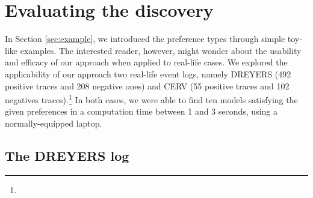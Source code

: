 









\section{Evaluating the discovery}
\label{sec:evaluation}


In Section \ref{sec:example}, we introduced the preference types through simple toy-like examples. The interested reader, however, might wonder about the usability and efficacy of our approach when applied to real-life cases. We explored the applicability of our approach  %
two real-life event logs, namely DREYERS (492 positive traces and 208 negative ones) and CERV (55 positive traces and 102 negatives traces).\footnote{} In both cases, we were able to find ten models satisfying the given preferences in a computation time between 1 and 3 seconds, using a normally-equipped laptop.



\subsection{The DREYERS log}
\label{subsec:dreyers}

